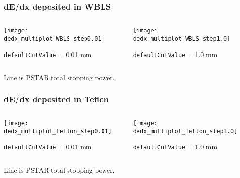 \documentclass[]{beamer}
\begin{document}
\begin{frame}[fragile]
  \frametitle{dE/dx deposited in WBLS}
  \begin{columns}
    \begin{column}{0.5\paperwidth}
      \texttt{[image: dedx\_multiplot\_WBLS\_step0.01]}

      \begin{center}
        \texttt{defaultCutValue} = 0.01 mm
      \end{center}
    \end{column}
    \begin{column}{0.5\paperwidth}
      \texttt{[image: dedx\_multiplot\_WBLS\_step1.0]}      

      \begin{center}
        \texttt{defaultCutValue} = 1.0 mm
      \end{center}
    \end{column}
  \end{columns}
  
  \begin{center}
    Line is PSTAR total stopping power.
  \end{center}
\end{frame}

\begin{frame}[fragile]
  \frametitle{dE/dx deposited in Teflon}
  \begin{columns}
    \begin{column}{0.5\paperwidth}
      \texttt{[image: dedx\_multiplot\_Teflon\_step0.01]}

      \begin{center}
        \texttt{defaultCutValue} = 0.01 mm
      \end{center}
    \end{column}
    \begin{column}{0.5\paperwidth}
      \texttt{[image: dedx\_multiplot\_Teflon\_step1.0]}      

      \begin{center}
        \texttt{defaultCutValue} = 1.0 mm
      \end{center}
    \end{column}
  \end{columns}
  
  \begin{center}
    Line is PSTAR total stopping power.
  \end{center}
\end{frame}
\end{document}
